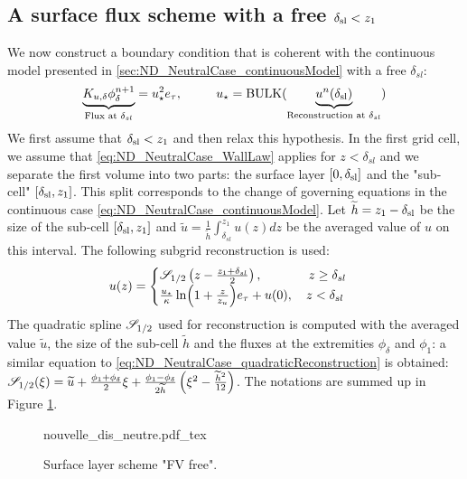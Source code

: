 \subsection{A surface flux scheme with a free $\delta_{\rm sl}<z_1$}
\label{sec:ND_NeutralCase_newSFscheme}
We now construct a boundary condition that is coherent
with the continuous model presented in
\ref{sec:ND_NeutralCase_continuousModel}
with a free $\delta_{sl}$:
\begin{equation}
	\label{eq:ND_NeutralCase_bottomCondFVFree}
	\underbrace{K_{u,\delta} \phi_{\delta}^{n+1}}_{\text{Flux at }
	\delta_{sl}}
		= u_\star^2 e_\tau, ~~~~~~~~
			  u_\star = {\rm BULK}(
			\underbrace{u^n(\delta_{\rm sl})}_{
				\text{Reconstruction at }
			\delta_{sl}})
\end{equation}
We first assume
that $\delta_{\rm sl} < z_1$ and then relax this hypothesis.
In the first grid cell, we assume that
\eqref{eq:ND_NeutralCase_WallLaw} applies for $z<\delta_{sl}$
and we separate the 
first volume into two parts: the surface layer $[0,\delta_{\rm sl}]$ and the "sub-cell" $[\delta_{\rm sl}, z_1]$.
This split corresponds to the change of governing equations
in the continuous case \eqref{eq:ND_NeutralCase_continuousModel}.
Let $\widetilde{h} = z_1 - \delta_{\rm sl}$  be the size of the sub-cell $[\delta_{\rm sl}, z_1]$
and $\widetilde{u} = \frac{1}{\widetilde{h}}\int_{\delta_{sl}}^{z_1}
u(z)dz$ be the averaged value of $u$ on this interval.
The following subgrid reconstruction is used:
\begin{equation}
	\label{eq:ND_NeutralCase_fullReconstruction}
	u(z) = \begin{cases}
		{\cal S}_{1/2}\left(z - \frac{z_1 +
				\delta_{sl}}{2}\right),
		~~~~~~~~~~~ z \geq \delta_{sl}
		\\
		\frac{{u_\star}}{\kappa}
		\ln(1+\frac{z}{z_{u}})e_\tau + u(0),
		~~~ z < \delta_{sl}
	\end{cases}
\end{equation}
The quadratic spline ${\cal S}_{1/2}$ used for reconstruction
is computed with the averaged value $\widetilde{u}$, the
size of the sub-cell $\widetilde{h}$ and the fluxes at the
extremities $\phi_{\delta}$ and $\phi_1$:
a similar equation to
\eqref{eq:ND_NeutralCase_quadraticReconstruction}
is obtained:
${\cal S}_{1/2}(\xi) = 
\widetilde{u} + \frac{\phi_{1} + \phi_{\delta}}{2} \xi
+ \frac{\phi_{1} - \phi_{\delta}}{2\widetilde{h}}
\left(\xi^2 - \frac{\widetilde{h}^2}{12}\right)$.
The notations are summed up in Figure
\ref{fig:ND_NeutralCase_nouvelle_dis_neutre}.
\begin{figure}
	{nouvelle_dis_neutre.pdf_tex}
	\caption{ Surface layer scheme "FV free".}
	\label{fig:ND_NeutralCase_nouvelle_dis_neutre}
\end{figure}
